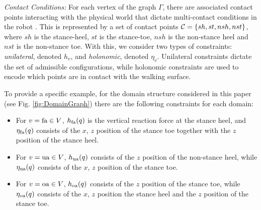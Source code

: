 {\it Contact Conditions:}  For each vertex of the graph $\Gamma$, there are associated contact points interacting with the physical world that dictate multi-contact conditions in the robot \cite{AVB:HSCC:11}. 
 This is represented by a set of contact points $\mathcal{C} = \{ sh, st, nsh, nst\}$, where $sh$ is the stance-heel, $st$ is the stance-toe, $nsh$ is the non-stance heel and $nst$ is the non-stance toe. With this, we consider two types of constraints: \emph{unilateral}, denoted $h_{v}$, and \emph{holonomic}, denoted $\eta_{v}$. Unilateral constraints dictate the set of admissible configurations, while holonomic constraints are used to encode which points are in contact with the walking surface.

\begin{myexample}
To provide a specific example, for the domain structure considered in this paper (see Fig. \ref{fig:DomainGraph}) there are the following constraints for each domain:
 \begin{itemize}
 \item For $v = \mathrm{fa} \in V$, $h_{\mathrm{fa}}(q)$ is the vertical reaction force at the stance heel, and $\eta_{\mathrm{fa}}(q)$ consists of the $x$, $z$ position of the stance toe together with the $z$ position of the stance heel.
\item For $v = \mathrm{ua} \in V$, $h_{\mathrm{ua}}(q)$ consists of the $z$ position of the non-stance heel, while $\eta_{\mathrm{ua}}(q)$ consists of the $x$, $z$ position of the stance toe.
\item For $v = \mathrm{oa} \in V$, $h_{\mathrm{oa}}(q)$ consists of the $z$ position of the stance toe, while $\eta_{\mathrm{oa}}(q)$ consists of the $x$, $z$ position the stance heel and the $z$ position of the stance toe.
 \end{itemize}
\end{myexample}

